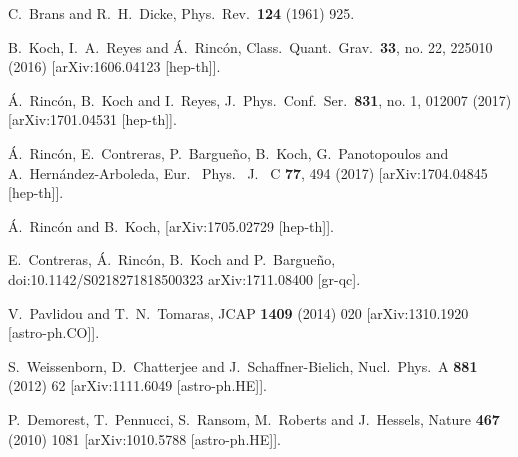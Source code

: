 \begin{thebibliography}{00}
 C.~Brans and R.~H.~Dicke,
  Phys.\ Rev.\  {\bf 124} (1961) 925.
  
 B.~Koch, I.~A.~Reyes and \'A.~Rinc\'on,
  Class.\ Quant.\ Grav.\  {\bf 33}, no. 22, 225010 (2016)
[arXiv:1606.04123 [hep-th]].


 \'A.~Rinc\'on, B.~Koch and I.~Reyes,
  J.\ Phys.\ Conf.\ Ser.\  {\bf 831}, no. 1, 012007 (2017)
[arXiv:1701.04531 [hep-th]].


  \'A.~Rinc\'on, E.~Contreras, P.~Bargue\~no, B.~Koch, G.~Panotopoulos and A.~Hern\'andez-Arboleda,
  Eur. \ Phys. \ J. \ C {\bf 77}, 494 (2017)
[arXiv:1704.04845 [hep-th]].

  
  \'A.~Rinc\'on and B.~Koch,
[arXiv:1705.02729 [hep-th]].
  
  E.~Contreras, \'A.~Rinc\'on, B.~Koch and P.~Bargue\~no,
  doi:10.1142/S0218271818500323
  arXiv:1711.08400 [gr-qc].  
  
 V.~Pavlidou and T.~N.~Tomaras,
  JCAP {\bf 1409} (2014) 020
[arXiv:1310.1920 [astro-ph.CO]].
  
 S.~Weissenborn, D.~Chatterjee and J.~Schaffner-Bielich,
  Nucl.\ Phys.\ A {\bf 881} (2012) 62
[arXiv:1111.6049 [astro-ph.HE]].

 P.~Demorest, T.~Pennucci, S.~Ransom, M.~Roberts and J.~Hessels,
  Nature {\bf 467} (2010) 1081
[arXiv:1010.5788 [astro-ph.HE]].


\end{thebibliography}
